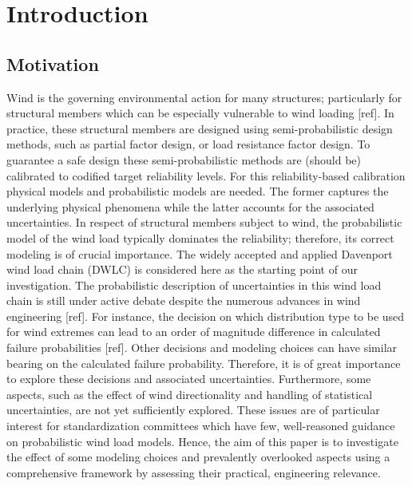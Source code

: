 \documentclass[fleqn]{article}
\begin{document}
\section{Introduction}

\subsection{Motivation}

Wind is the governing environmental action for many structures; particularly for structural members which can be especially vulnerable to wind loading [ref]. In practice, these structural members are designed using semi-probabilistic design methods, such as partial factor design, or load resistance factor design. To guarantee a safe design these semi-probabilistic methods are (should be) calibrated to codified target reliability levels. For this reliability-based calibration physical models and probabilistic models are needed. The former captures the underlying physical phenomena while the latter accounts for the associated uncertainties. In respect of structural members subject to wind, the probabilistic model of the wind load typically dominates the reliability; therefore, its correct modeling is of crucial importance. The widely accepted and applied Davenport wind load chain (DWLC) is considered here as the starting point of our investigation. The probabilistic description of uncertainties in this wind load chain is still under active debate despite the numerous advances in wind engineering [ref]. For instance, the decision on which distribution type to be used for wind extremes can lead to an order of magnitude difference in calculated failure probabilities [ref]. Other decisions and modeling choices can have similar bearing on the calculated failure probability. Therefore, it is of great importance to explore these decisions and associated uncertainties. Furthermore, some aspects, such as the effect of wind directionality and handling of statistical uncertainties, are not yet sufficiently explored. These issues are of particular interest for standardization committees which have few, well-reasoned guidance on probabilistic wind load models. Hence, the aim of this paper is to investigate the effect of some modeling choices and prevalently overlooked aspects using a comprehensive framework by assessing their practical, engineering relevance.
\end{document}
